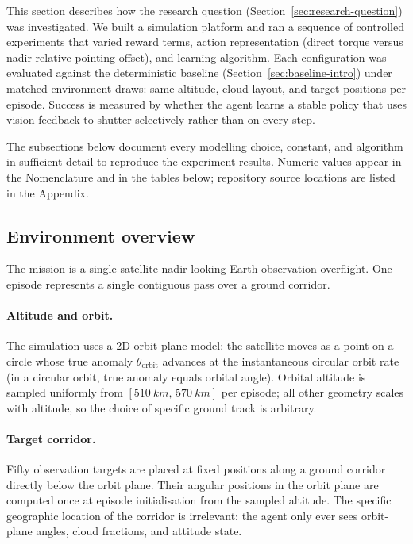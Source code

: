 \label{sec:methods}

This section describes how the research question (Section~\ref{sec:research-question}) was investigated.
We built a simulation platform and ran a sequence of controlled experiments that varied reward terms, action representation (direct torque versus nadir-relative pointing offset), and learning algorithm.
Each configuration was evaluated against the deterministic baseline (Section~\ref{sec:baseline-intro}) under matched environment draws: same altitude, cloud layout, and target positions per episode.
Success is measured by whether the agent learns a stable policy that uses vision feedback to shutter selectively rather than on every step.

The subsections below document every modelling choice, constant, and algorithm in sufficient detail to reproduce the experiment results.
Numeric values appear in the Nomenclature and in the tables below; repository source locations are listed in the Appendix.

\subsection{Environment overview}
\label{sec:env-overview}

The mission is a single-satellite nadir-looking Earth-observation overflight.
One episode represents a single contiguous pass over a ground corridor.

\paragraph{Altitude and orbit.}
The simulation uses a 2D orbit-plane model: the satellite moves as a point on a circle whose true anomaly $\theta_\text{orbit}$ advances at the instantaneous circular orbit rate (in a circular orbit, true anomaly equals orbital angle).
Orbital altitude is sampled uniformly from $[\SI{510}{km},\,\SI{570}{km}]$ per episode; all other geometry scales with altitude, so the choice of specific ground track is arbitrary.

\paragraph{Target corridor.}
Fifty observation targets are placed at fixed positions along a ground corridor directly below the orbit plane.
Their angular positions in the orbit plane are computed once at episode initialisation from the sampled altitude.
The specific geographic location of the corridor is irrelevant: the agent only ever sees orbit-plane angles, cloud fractions, and attitude state.

